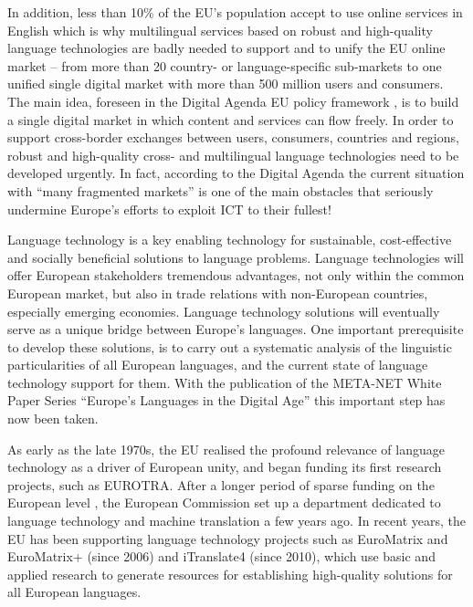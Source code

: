 \documentclass[10pt, plain]{../../metanetpaper}
\begin{document}
\begin{multicols}{2}
In addition, less than 10\% of the EU's population accept to use online services in English which is why multilingual services based on robust and high-quality language technologies are badly needed to support and to unify the EU online market -- from more than 20 country- or language-specific sub-markets to one unified single digital market with more than 500 million users and consumers. The main idea, foreseen in the Digital Agenda EU policy framework \cite{DA2010}, is to build a single digital market in which content and services can flow freely. In order to support cross-border exchanges between users, consumers, countries and regions, robust and high-quality cross- and multilingual language technologies need to be developed urgently. In fact, according to the Digital Agenda \cite{DA2010} the current situation with ``many fragmented markets'' is one of the main obstacles that seriously undermine Europe's efforts to exploit ICT to their fullest!

Language technology is a key enabling technology for sustainable, cost-effective and socially beneficial solutions to language problems. Language technologies will offer European stakeholders tremendous advantages, not only within the common European market, but also in trade relations with non-European countries, especially emerging economies. Language technology solutions will eventually serve as a unique bridge between Europe's languages. One important prerequisite to develop these solutions, is to carry out a systematic analysis of the linguistic particularities of all European languages, and the current state of language technology support for them. With the publication of the META-NET White Paper Series ``Europe's Languages in the Digital Age'' \cite{LWP2012} this important step has now been taken.

As early as the late 1970s, the EU realised the profound relevance of language technology as a driver of European unity, and began funding its first research projects, such as EUROTRA. After a longer period of sparse funding on the European level \cite{laz1,euromap}, the European Commission set up a department dedicated to language technology and machine translation a few years ago. In recent years, the EU has been supporting language technology projects such as EuroMatrix and EuroMatrix+ (since 2006) and iTranslate4 (since 2010), which use basic and applied research to generate resources for establishing high-quality solutions for all European languages.


\end{multicols}
\end{document}
